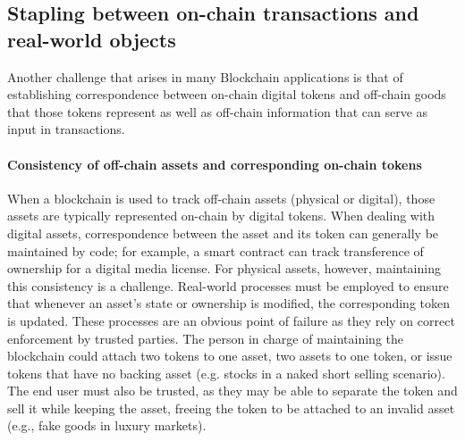 
\subsection{Stapling between on-chain transactions and real-world objects}
Another challenge that arises in many Blockchain applications is that of establishing correspondence between on-chain digital tokens and off-chain goods that those tokens represent as well as off-chain information that can serve as input in transactions.  

\paragraph{Consistency of off-chain assets and corresponding on-chain tokens}
When a blockchain is used to track off-chain assets (physical or digital), those assets are typically represented on-chain by digital tokens. When dealing with digital assets, correspondence between the asset and its token can generally be maintained by code; for example, a smart contract can track transference of ownership for a digital media license. For physical assets, however, maintaining this consistency is a challenge. Real-world processes must be employed to ensure that whenever an asset's state or ownership is modified, the corresponding token is updated. These processes are an obvious point of failure as they rely on correct enforcement by trusted parties. The person in charge of maintaining the blockchain could attach two tokens to one asset, two assets to one token, or issue tokens that have no backing asset (e.g. stocks in a naked short selling scenario). The end user must also be trusted, as they may be able to separate the token and sell it while keeping the asset, freeing the token to be attached to an invalid asset (e.g., fake goods in luxury markets). 




